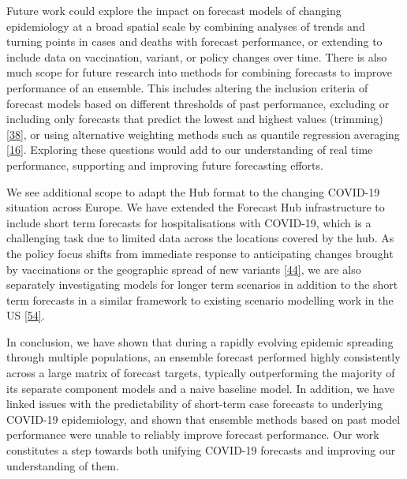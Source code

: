 \documentclass[
]{article}
\providecommand{\DIFaddbegin}{} %
\providecommand{\DIFaddend}{} %
\providecommand{\DIFdelbegin}{} %
\providecommand{\DIFdelend}{} %
\newcommand{\DIFscaledelfig}{0.5}
\newlength{\DIFdelgraphicswidth} %
\newlength{\DIFdelgraphicsheight} %
\newcommand{\DIFaddincludegraphics}[2][]{{\color{blue}\fbox{\DIFOincludegraphics[#1]{#2}}}} %
\newcommand{\DIFdelincludegraphics}[2][]{%
\sbox{\DIFdelgraphicsbox}{\DIFOincludegraphics[#1]{#2}}%
\settoboxwidth{\DIFdelgraphicswidth}{\DIFdelgraphicsbox} %
\settoboxtotalheight{\DIFdelgraphicsheight}{\DIFdelgraphicsbox} %
\scalebox{\DIFscaledelfig}{%
\parbox[b]{\DIFdelgraphicswidth}{\usebox{\DIFdelgraphicsbox}\\[-\baselineskip] \rule{\DIFdelgraphicswidth}{0em}}\llap{\resizebox{\DIFdelgraphicswidth}{\DIFdelgraphicsheight}{%
\setlength{\unitlength}{\DIFdelgraphicswidth}%
\begin{picture}(1,1)%
\thicklines\linethickness{2pt} %
{\color[rgb]{1,0,0}\put(0,0){\framebox(1,1){}}}%
{\color[rgb]{1,0,0}\put(0,0){\line( 1,1){1}}}%
{\color[rgb]{1,0,0}\put(0,1){\line(1,-1){1}}}%
\end{picture}%
}\hspace*{3pt}}} %
} %
\DeclareRobustCommand{\DIFaddbegin}{\DIFOaddbegin \let\includegraphics\DIFaddincludegraphics} %
\DeclareRobustCommand{\DIFaddend}{\DIFOaddend \let\includegraphics\DIFOincludegraphics} %
\DeclareRobustCommand{\DIFdelbegin}{\DIFOdelbegin \let\includegraphics\DIFdelincludegraphics} %
\DeclareRobustCommand{\DIFdelend}{\DIFOaddend \let\includegraphics\DIFOincludegraphics} %
\begin{document}
Future work could explore the impact on forecast models of changing epidemiology at a broad spatial scale by combining analyses of trends and turning points in cases and deaths with forecast performance, or extending to include data on vaccination, variant, or policy changes over time. There is also much scope for future research into methods for combining forecasts to improve performance of an ensemble. This includes altering the inclusion criteria of forecast models based on different thresholds of past performance, excluding or including only forecasts that predict the lowest and highest values (trimming) \protect\DIFdelbegin %
\DIFdelend \DIFaddbegin \hyperlink{ref-taylorCombiningProbabilisticForecasts2021}{{[}38{]}}\DIFaddend , or using alternative weighting methods such as quantile regression averaging \protect\DIFdelbegin %
\DIFdelend \DIFaddbegin \hyperlink{ref-funkShorttermForecastsInform2020}{{[}16{]}}\DIFaddend . Exploring these questions would add to our understanding of real time performance, supporting and improving future forecasting efforts.

We see additional scope to adapt the Hub format to the changing COVID-19 situation across Europe. We have extended the Forecast Hub infrastructure to include short term forecasts for hospitalisations with COVID-19, which is a challenging task due to limited data across the locations covered by the hub. As the policy focus shifts from immediate response to anticipating changes brought by vaccinations or the geographic spread of new variants \protect\DIFdelbegin %
\DIFdelend \DIFaddbegin \hyperlink{ref-europeancentrefordiseasepreventionandcontrolOverviewImplementationCOVID192021}{{[}44{]}}\DIFaddend , we are also separately investigating models for longer term scenarios in addition to the short term forecasts in a similar framework to existing scenario modelling work in the US \protect\DIFdelbegin %
\DIFdelend \DIFaddbegin \hyperlink{ref-borcheringModelingFutureCOVID192021}{{[}54{]}}\DIFaddend .

In conclusion, we have shown that during a rapidly evolving epidemic spreading through multiple populations, an ensemble forecast performed highly consistently across a large matrix of forecast targets, typically outperforming the majority of its separate component models and a naive baseline model. In addition, we have linked issues with the predictability of short-term case forecasts to underlying COVID-19 epidemiology, and shown that ensemble methods based on past model performance were unable to reliably improve forecast performance. Our work constitutes a step towards both unifying COVID-19 forecasts and improving our understanding of them.
\end{document}
